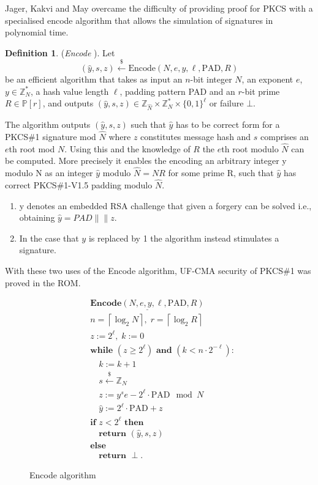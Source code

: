 \documentclass[]{final_report}
\theoremstyle{definition}
\newtheorem{definition}{Definition}[chapter]
\begin{document}
Jager, Kakvi and May overcame the difficulty of providing proof for PKCS with a specialised encode algorithm that allows the simulation of signatures in polynomial time.  

\begin{definition} (\textit{Encode} \cite{jager2018security}).
Let
\[
(\widehat{y}, s, z) \xleftarrow{\$} \text{Encode}(N, e, y, \ell, \text{PAD}, R)
\]
be an efficient algorithm that takes as input an \(n\)-bit integer \(N\), an exponent \(e\), \(y \in \mathbb{Z}_N^*\), a hash value length $\ell$, padding pattern PAD and an \(r\)-bit prime \(R \in \mathbb{P}[r]\), and outputs \((\widehat{y}, s, z) \in \mathbb{Z}_{\widehat{N}} \times \mathbb{Z}_N^* \times \{0, 1\}^\ell\) or failure \(\bot\). \

\end{definition}

The algorithm outputs \((\widehat{y}, s, z)\) such that \(\widehat{y}\) has to be correct form for a PKCS\#1 signature mod \(\widehat{N}\) where \(z\) constitutes message hash and \(s\) comprises an \(e\)th root mod \(N\). Using this and the knowledge of \(R\) the \(e\)th root modulo \(\widehat{N}\) can be computed. More precisely it enables the encoding an arbitrary integer y modulo N as an integer $\hat{y}$ modulo $\hat{N} = NR$ for some prime R, such that $\widehat{y}$ has correct PKCS\#1-V1.5 padding modulo $\hat{N}$.

\begin{enumerate}
\item y denotes an embedded RSA challenge that given a forgery can be solved i.e., obtaining \(\widehat{y} = PAD\|\|z \). 
\item In the case that \(y\) is replaced by 1 the algorithm instead stimulates a signature. 
\end{enumerate}
With these two uses of the Encode algorithm, UF-CMA security of PKCS\#1 was proved in the ROM. 

\begin{figure}[H]
\centering
\[
\boxed{
\begin{aligned}
&\underline{\textbf{Encode} (N, e, y, \ell, \text{PAD}, R)} \\
&n = \left\lceil \log_2 N \right\rceil, \; r = \left\lceil \log_2 R \right\rceil \\
&z := 2^\ell, \; k := 0 \\
&\textbf{while } (z \geq 2^\ell) \textbf{ and } (k < n \cdot 2^{-\ell}): \\
&\quad k := k + 1 \\
&\quad s \xleftarrow{\$} \mathbb{Z}_N \\
&\quad z := y^s e - 2^\ell \cdot \text{PAD} \mod N \\
&\quad \widehat{y} := 2^\ell \cdot \text{PAD} + z \\
&\textbf{if } z < 2^\ell \textbf{ then} \\
&\quad \textbf{return } (\widehat{y}, s, z) \\
&\textbf{else} \\
&\quad \textbf{return } \perp.
\end{aligned}
}
\]
\caption{Encode algorithm \cite{jager2018security}}
\label{fig:encode}
\end{figure}
\end{document}
